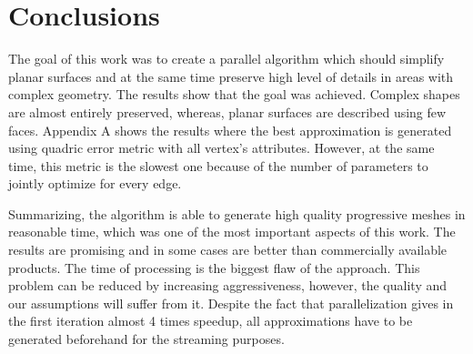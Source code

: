 \chapter{Conclusions}
\thispagestyle{empty}%

The goal of this work was to create a parallel algorithm which should simplify planar surfaces and at the same time preserve high level of details in areas with complex geometry. The results show that the goal was achieved. Complex shapes are almost entirely preserved, whereas, planar surfaces are described using few faces. Appendix A shows the results where the best approximation is generated using quadric error metric with all vertex's attributes. However, at the same time, this metric is the slowest one because of the number of parameters to jointly optimize for every edge.

Summarizing, the algorithm is able to generate high quality progressive meshes in reasonable time, which was one of the most important aspects of this work. The results are promising and in some cases are better than commercially available products. The time of processing is the biggest flaw of the approach. This problem can be reduced by increasing aggressiveness, however, the quality and our assumptions will suffer from it. Despite the fact that parallelization gives in the first iteration almost 4 times speedup, all approximations have to be generated beforehand for the streaming purposes.
